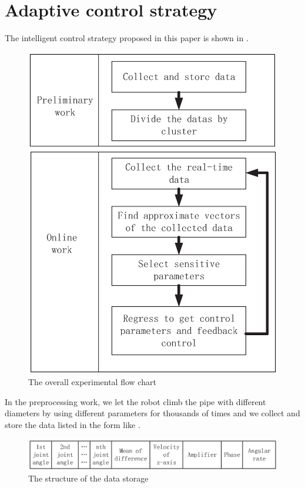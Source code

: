\section{Adaptive control strategy}

The intelligent control strategy proposed in this paper is shown in .
\begin{figure}[H]
	\centering
	\includegraphics[width=.8\linewidth]{fig/mainwork/stepMap}
	\caption{The overall experimental flow chart}
\end{figure}

 In the preprocessing work, we let the robot climb the pipe with different diameters by using different parameters for thousands of times and we collect and store the data listed in the form like .
\begin{figure}[H]
	\centering
	\includegraphics[width=\linewidth]{fig/mainwork/data}
	\caption{The structure of the data storage}
\end{figure}

